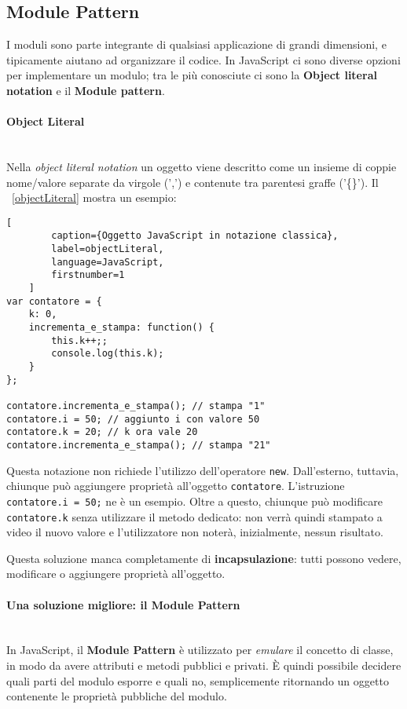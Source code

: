\subsection{Module Pattern}
I moduli sono parte integrante di qualsiasi applicazione di grandi dimensioni, e tipicamente aiutano ad organizzare il codice. In JavaScript ci sono diverse opzioni per implementare un modulo; tra le più conosciute ci sono la \textbf{Object literal notation} e il \textbf{Module pattern}.

\paragraph{Object Literal} \mbox{} \\
Nella \textit{object literal notation} un oggetto viene descritto come un insieme di coppie nome/valore separate da virgole (',') e contenute tra parentesi graffe ('\{\}'). Il \lstlistingname~\ref{objectLiteral} mostra un esempio:
\begin{lstlisting}[
		caption={Oggetto JavaScript in notazione classica},
		label=objectLiteral,
		language=JavaScript,
		firstnumber=1
	]
var contatore = {
	k: 0,
	incrementa_e_stampa: function() {
		this.k++;;
		console.log(this.k);
	}
};

contatore.incrementa_e_stampa(); // stampa "1"
contatore.i = 50; // aggiunto i con valore 50
contatore.k = 20; // k ora vale 20
contatore.incrementa_e_stampa(); // stampa "21"
\end{lstlisting}
Questa notazione non richiede l'utilizzo dell'operatore \texttt{new}. Dall'esterno, tuttavia, chiunque può aggiungere proprietà all'oggetto \texttt{contatore}. L'istruzione \texttt{contatore.i = 50;} ne è un esempio. Oltre a questo, chiunque può modificare \texttt{contatore.k} senza utilizzare il metodo dedicato: non verrà quindi stampato a video il nuovo valore e l'utilizzatore non noterà, inizialmente, nessun risultato.

Questa soluzione manca completamente di \textbf{incapsulazione}: tutti possono vedere, modificare o aggiungere proprietà all'oggetto.

\paragraph{Una soluzione migliore: il Module Pattern} \mbox{} \\
In JavaScript, il \textbf{Module Pattern} è utilizzato per \textit{emulare} il concetto di classe, in modo da avere attributi e metodi pubblici e privati. È quindi possibile decidere quali parti del modulo esporre e quali no, semplicemente ritornando un oggetto contenente le proprietà pubbliche del modulo. 

